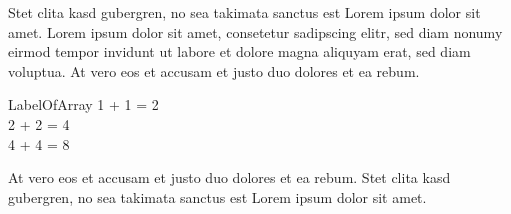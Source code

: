 \begin{EOAquote}
Stet clita kasd gubergren, no sea
takimata sanctus est Lorem ipsum dolor sit amet.
Lorem ipsum dolor sit amet, consetetur sadipscing
elitr, sed diam nonumy eirmod tempor invidunt ut
labore et dolore magna aliquyam erat, sed diam
voluptua. At vero eos et accusam et justo duo
dolores et ea
rebum.
\end{EOAquote}

\begin{EOAequationarray}{LabelOfArray}
    1 + 1 = 2\\
    2 + 2 = 4\\
    4 + 4 = 8
\end{EOAequationarray}


At vero eos et accusam et justo duo dolores et ea
rebum. Stet clita kasd gubergren, no sea takimata
sanctus est Lorem ipsum dolor sit amet.


